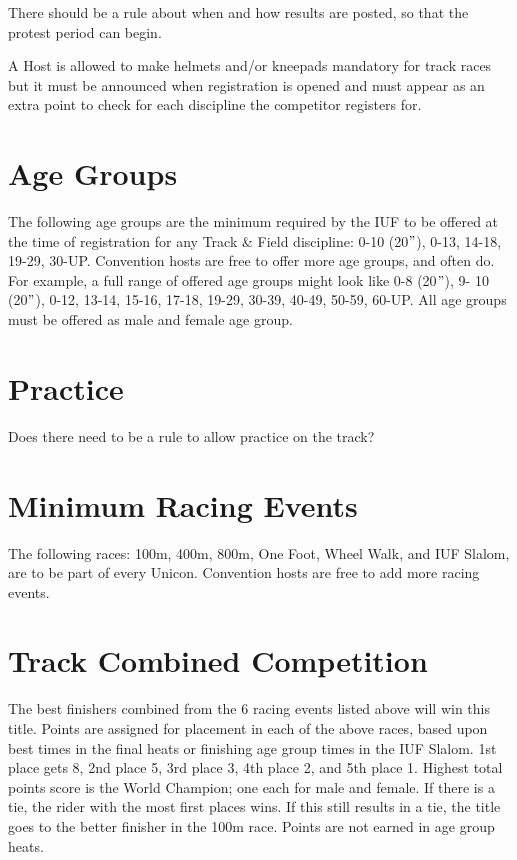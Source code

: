 \begin{framed}
There should be a rule about when and how results are posted, so that the
protest period can begin.
\end{framed}

A Host is allowed to make helmets and/or kneepads mandatory for track races but it must be announced when registration is opened and must appear as an extra point to check for each discipline the competitor registers for.

\section{Age Groups \label{subsec:track-field_racing-categories_age-groups}}
The following age groups are the minimum required by the IUF to be offered at the time of registration for any Track \& Field discipline: 0-10 (20$"$), 0-13, 14-18, 19-29, 30-UP.
Convention hosts are free to offer more age groups, and often do.
For example, a full range of offered age groups might look like 0-8 (20$"$), 9- 10 (20$"$), 0-12, 13-14, 15-16, 17-18, 19-29, 30-39, 40-49, 50-59, 60-UP.
All age groups must be offered as male and female age group.

\section{Practice}

\begin{framed}
Does there need to be a rule to allow practice on the track?
\end{framed}

\section{Minimum Racing Events \label{sec:track-field_minimum-racing-events}}
The following races: 100m, 400m, 800m, One Foot, Wheel Walk, and IUF Slalom, are to be part of every Unicon.
Convention hosts are free to add more racing events.

\section{Track Combined Competition}
The best finishers combined from the 6 racing events listed above will win this title.
Points are assigned for placement in each of the above races, based upon best times in the final heats or finishing age group times in the IUF Slalom.
1st place gets 8, 2nd place 5, 3rd place 3, 4th place 2, and 5th place 1.
Highest total points score is the World Champion; one each for male and female.
If there is a tie, the rider with the most first places wins.
If this still results in a tie, the title goes to the better finisher in the 100m race.
Points are not earned in age group heats.

